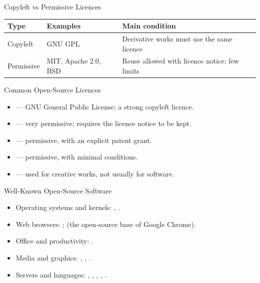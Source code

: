 \documentclass[aspectratio=169]{beamer}
\begin{document}
\begin{frame}{Copyleft vs Permissive Licences}
  \begin{center}
    \begin{tabular}{p{}p{}p{}}
      \toprule
      \textbf{Type} & \textbf{Examples} & \textbf{Main condition} \\
      \midrule
      Copyleft & GNU GPL & Derivative works must use the same licence \\
      Permissive & MIT, Apache 2.0, BSD & Reuse allowed with licence notice; few limits \\
      \bottomrule
    \end{tabular}
  \end{center}
  \vspace{0.25cm}
\end{frame}

\begin{frame}{Common Open-Source Licences}
  \begin{itemize}
    \item {} --- GNU General Public License; a strong copyleft
      licence.
    \item {} --- very permissive; requires the licence notice to
      be kept.
    \item {} --- permissive, with an explicit patent
      grant.
    \item {} --- permissive, with minimal conditions.
    \item {} --- used for creative works, not usually for
      software.
  \end{itemize}
\end{frame}

\begin{frame}{Well-Known Open-Source Software}
  \begin{itemize}
    \item Operating systems and kernels: , .
    \item Web browsers: ;  (the open-source
      base of Google Chrome).
    \item Office and productivity: .
    \item Media and graphics: , ,
      .
    \item Servers and languages: , ,
      , , .
  \end{itemize}
\end{frame}
\end{document}
